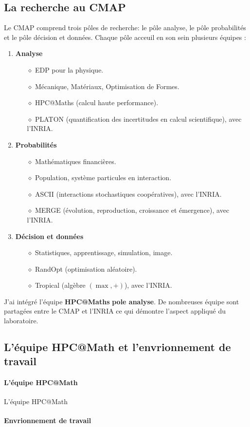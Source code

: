 \subsection{La recherche au CMAP}
Le CMAP comprend trois pôles  de recherche: le pôle analyse, le pôle probabilités et le pôle décision et données. Chaque pôle acceuil en son sein plusieurs équipes :
\begin{enumerate}
    \item \textbf{Analyse}
        \begin{itemize}
            \item[$\diamond$] EDP pour la physique.
            \item[$\diamond$] Mécanique, Matériaux, Optimisation de Formes.
            \item[$\diamond$] HPC@Maths (calcul haute performance).
            \item[$\diamond$] PLATON (quantification des incertitudes en calcul scientifique), avec l'INRIA.
        \end{itemize}
    \item \textbf{Probabilités}
        \begin{itemize}
            \item[$\diamond$] Mathématiques financières.
            \item[$\diamond$] Population, système particules en interaction.
            \item[$\diamond$] ASCII (interactions stochastiques coopératives), avec l'INRIA.
            \item[$\diamond$] MERGE (évolution, reproduction, croissance et émergence), avec l'INRIA.
        \end{itemize}
    \item \textbf{Décision et données}
        \begin{itemize}
            \item[$\diamond$] Statistiques, apprentissage, simulation, image.
            \item[$\diamond$] RandOpt (optimisation aléatoire).
            \item[$\diamond$] Tropical (algèbre $(\max , +)$), avec l’INRIA.
        \end{itemize}
\end{enumerate}
J'ai intégré l'équipe \textbf{HPC@Maths} \textbf{pole analyse}.
De nombreuses équipe sont partagées entre le CMAP et l'INRIA ce qui démontre l'aspect appliqué du laboratoire.

\subsection{L'équipe HPC@Math et l'envrionnement de travail}
\paragraph{L'équipe HPC@Math}
    L'équipe HPC@Math
\paragraph{Envrionnement de travail}
